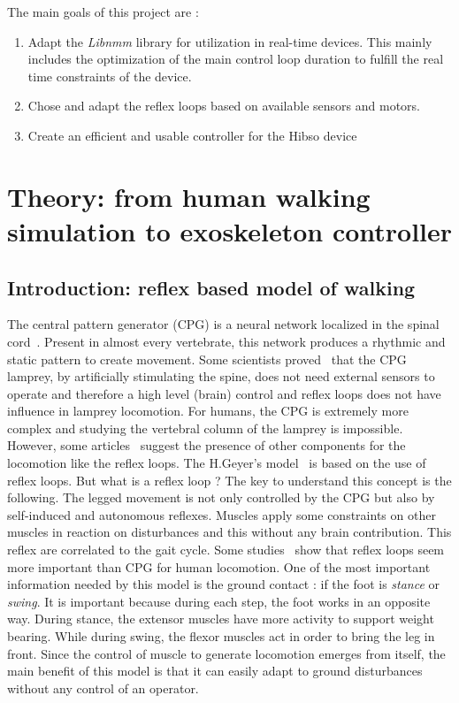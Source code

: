 \documentclass[a4paper,12pt]{article}
\begin{document}
\medbreak
The main goals of this project are :
\begin{enumerate}
\item Adapt the \textit{Libnmm} library for utilization in real-time devices.
This mainly includes the optimization of the main control loop duration to fulfill the real time constraints of the device.
\item Chose and adapt the reflex loops based on available sensors and motors.
\item Create an efficient and usable controller for the Hibso device
\end{enumerate}

\newpage

\section{Theory: from human walking simulation to exoskeleton controller}
\subsection{Introduction: reflex based model of walking}

The  central pattern generator (CPG) is a neural network localized in the spinal cord~\cite{dimitrijevic1998evidence}. Present in almost every vertebrate, this network produces a rhythmic and static pattern to create movement. Some scientists proved~\cite{ijspeert1999evolution} that the CPG lamprey, by artificially stimulating the spine, does not need external sensors to operate and therefore a high level (brain) control and reflex loops does not have influence in lamprey locomotion. For humans, the CPG is extremely more complex and studying the vertebral column of the lamprey is impossible. However, some articles~\cite{dzeladini2014contribution} suggest the presence of other components for the locomotion like the reflex loops.
\medbreak	
The H.Geyer's model~\cite{geyer2010muscle} is based on the use of reflex loops. But what is a reflex loop ? The key to understand this concept is the following. The legged movement is not only controlled by the CPG but also by self-induced and autonomous reflexes. Muscles apply some constraints on other muscles in reaction on disturbances and this without any brain contribution. This reflex are correlated to the gait cycle. Some studies~\cite{pearson2006assessing} show that reflex loops seem more important than CPG for human locomotion. 
\medbreak
One of the most important information needed by this model is the ground contact : if the foot is \textit{stance} or \textit{swing}. It is important because during each step, the foot works in an opposite way. During stance, the extensor muscles have more activity to support weight bearing. While during swing, the flexor muscles act in order to bring the leg in front.
\medbreak
Since the control of muscle to generate locomotion emerges from itself, the main benefit of this model is that it can easily adapt to ground disturbances without any control of an operator.
\end{document}
